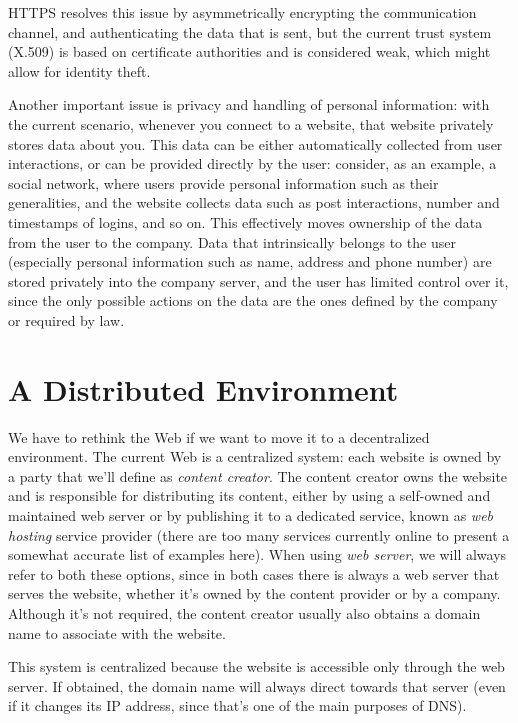 \documentclass[mscthesis]{usiinfthesis}
\begin{document}
HTTPS resolves this issue by asymmetrically encrypting the communication channel, and authenticating the data that is sent, but the current trust system (X.509) is based on certificate authorities and is considered weak, which might allow for identity theft. %

Another important issue is privacy and handling of personal information: with the current scenario, whenever you connect to a website, that website privately stores data about you.
This data can be either automatically collected from user interactions, or can be provided directly by the user: consider, as an example, a social network, where users provide personal information such as their generalities, and the website collects data such as post interactions, number and timestamps of logins, and so on.
This effectively moves ownership of the data from the user to the company. Data that intrinsically belongs to the user (especially personal information such as name, address and phone number) are stored privately into the company server, and the user has limited control over it, since the only possible actions on the data are the ones defined by the company or required by law.

\section{A Distributed Environment} \label{sec:distributed}
We have to rethink the Web if we want to move it to a decentralized environment. The current Web is a centralized system: each website is owned by a party that we'll define as \textit{content creator}. The content creator owns the website and is responsible for distributing its content, either by using a self-owned and maintained web server or by publishing it to a dedicated service, known as \textit{web hosting} service provider (there are too many services currently online to present a somewhat accurate list of examples here). When using \textit{web server}, we will always refer to both these options, since in both cases there is always a web server that serves the website, whether it's owned by the content provider or by a company.
Although it's not required, the content creator usually also obtains a domain name to associate with the website.

This system is centralized because the website is accessible only through the web server. If obtained, the domain name will always direct towards that server (even if it changes its IP address, since that's one of the main purposes of DNS).
\end{document}
